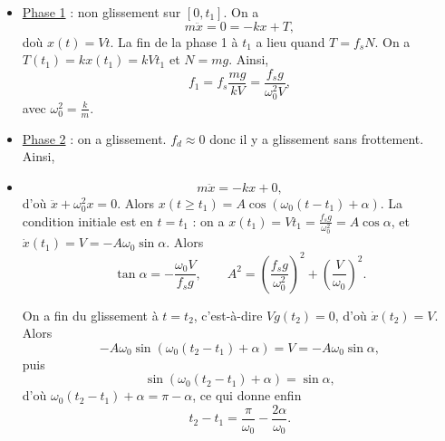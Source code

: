         \begin{itemize}
            \item \underline{Phase 1} : non glissement sur $[0,t_1]$. On a 
            \begin{equation}
                m\ddot{x}=0=-kx+T,
            \end{equation}
            doù $x(t)=Vt$. La fin de la phase 1 à $t_1$ a lieu quand $T=f_s N$. On a $T(t_1)=kx(t_1)=kVt_1$ et $N=mg$. Ainsi,
            \begin{equation}
                f_1=f_s\frac{mg}{kV}=\frac{f_s g}{\omega_{0}^{2}V},
            \end{equation}
            avec $\omega_{0}^{2}=\frac{k}{m}$.

            \item \underline{Phase 2} : on a glissement. $f_d\approx0$ donc il y a glissement sans frottement. Ainsi,
            \item \begin{equation}
                m\ddot{x}=-kx+0,
            \end{equation}
            d'où $\ddot{x}+\omega_{0}^{2}x=0$. Alors $x(t\geqslant t_1)=A\cos\left(\omega_0(t-t_1)+\alpha\right)$. La condition initiale est en $t=t_1$ : on a $x(t_1)=Vt_1=\frac{f_s g}{\omega_{0}^{2}}=A\cos\alpha$, et $\dot{x}(t_1)=V=-A\omega_0\sin\alpha$. Alors
            \begin{equation}
                \tan\alpha=-\frac{\omega_0 V}{f_s g},\qquad A^{2}=\left(\frac{f_s g}{\omega_{0}^{2}}\right)^{2}+\left(\frac{V}{\omega_0}\right)^{2}.
            \end{equation}

            On a fin du glissement à $t=t_2$, c'est-à-dire $Vg(t_2)=0$, d'où $\dot{x}(t_2)=V$. Alors
            \begin{equation}
                -A\omega_0\sin\left(\omega_0(t_2-t_1)+\alpha\right)=V=-A\omega_0\sin\alpha,
            \end{equation}
            puis
            \begin{equation}
                \sin\left(\omega_0(t_2-t_1)+\alpha\right)=\sin\alpha,
            \end{equation}
            d'où $\omega_0(t_2-t_1)+\alpha=\pi-\alpha$, ce qui donne enfin
            \begin{equation}
                t_2-t_1=\frac{\pi}{\omega_0}-\frac{2\alpha}{\omega_0}.
            \end{equation}


\end{itemize}
